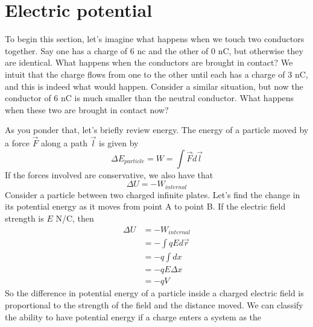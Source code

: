 \documentclass[nobib]{tufte-handout}
\begin{document}
\pagebreak 

\section{Electric potential} 
To begin this section, let's imagine what happens when we touch two 
conductors together. Say one has a charge of 6 nc and the other of 0 nC, 
but otherwise they are identical. What happens when the conductors are brought 
in contact? We intuit that the charge flows from one to the other 
until each has a charge of 3 nC, and this is indeed what would happen. 
Consider a similar situation, but now the conductor of 6 nC is 
much smaller than the neutral conductor. What happens when these two 
are brought in contact now?

As you ponder that, let's briefly review energy. The energy of 
a particle moved by a force $\vec{F}$ along a path $\vec{l}$ is given by 
\[\Delta E_{particle} = W = \int \vec{F} \dot d\vec{l}\]
If the forces involved are conservative, we also have that 
\[\Delta U = -W_{internal}\]
Consider a particle between two charged infinite plates. Let's find the change in its potential energy
as it moves from point A to point B. If the electric field strength is $E$ N/C, 
then 
\begin{align*}
    \Delta U &= -W_{internal} \\
    &= -\int qE d\vec{r} \\
    &= -q\int dx \\
    &= -qE\Delta x \\
    &= -qV
\end{align*}
So the difference in potential energy of a particle inside a charged 
electric field is proportional to the strength of the field and the distance
moved. We can classify the ability to have potential energy 
if a charge enters a system as the
\end{document}

